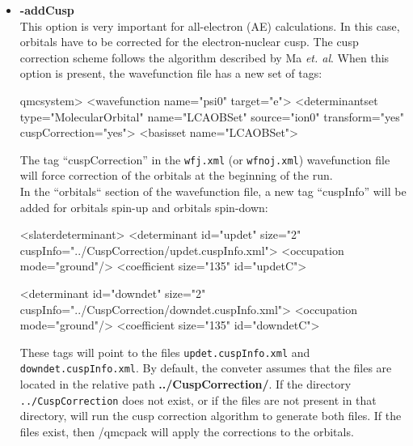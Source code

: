 \begin{itemize}
\begin{itemize}
\end{itemize}


\item \textbf{-addCusp} \\ This option is very important for
  all-electron (AE) calculations. In this case, orbitals have to be
  corrected for the electron-nuclear cusp. The cusp correction scheme
  follows the algorithm described by Ma \textit{et. al}. \cite{Ma2005}
  When this option is present, the wavefunction file has a new set of
  tags:

\begin{shade}
 qmcsystem>
  <wavefunction name="psi0" target="e">
    <determinantset type="MolecularOrbital" name="LCAOBSet" source="ion0"
      transform="yes" cuspCorrection="yes">
      <basisset name="LCAOBSet">
\end{shade}

The tag ``cuspCorrection'' in the \texttt{wfj.xml} (or \texttt{wfnoj.xml}) wavefunction file will force correction of the orbitals at the beginning of the \qmcpack run. \\
In the ``orbitals`` section of the wavefunction file, a new tag ``cuspInfo'' will be added for orbitals spin-up and orbitals spin-down:

\begin{shade}
   <slaterdeterminant>
        <determinant id="updet" size="2"
            cuspInfo="../CuspCorrection/updet.cuspInfo.xml">
          <occupation mode="ground"/>
          <coefficient size="135" id="updetC">
          
  <determinant id="downdet" size="2"
           cuspInfo="../CuspCorrection/downdet.cuspInfo.xml">
          <occupation mode="ground"/>
          <coefficient size="135" id="downdetC">
\end{shade}

These tags will point to the files \texttt{updet.cuspInfo.xml} and
\texttt{downdet.cuspInfo.xml}. By default, the conveter assumes that
the files are located in the relative path
\textbf{../CuspCorrection/}. If the directory
\texttt{../CuspCorrection} does not exist, or if the files are not
present in that directory, \qmcpack will run the cusp correction
algorithm to generate both files.  If the files exist, then /qmcpack
will apply the corrections to the orbitals. \\


\end{itemize}
